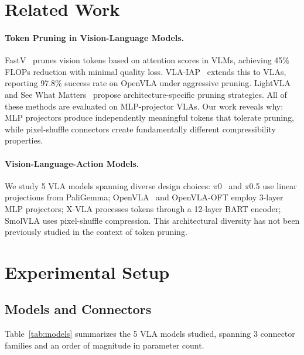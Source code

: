 \documentclass[10pt,twocolumn]{article}
\begin{document}
\section{Related Work}

\paragraph{Token Pruning in Vision-Language Models.}
FastV~\cite{chen2024fastv} prunes vision tokens based on attention scores in VLMs, achieving 45\% FLOPs reduction with minimal quality loss.
VLA-IAP~\cite{tang2024vlaiap} extends this to VLAs, reporting 97.8\% success rate on OpenVLA under aggressive pruning.
LightVLA~\cite{zhang2024lightvla} and See What Matters~\cite{seewhatmatters2026} propose architecture-specific pruning strategies.
All of these methods are evaluated on MLP-projector VLAs.
Our work reveals why: MLP projectors produce independently meaningful tokens that tolerate pruning, while pixel-shuffle connectors create fundamentally different compressibility properties.

\paragraph{Vision-Language-Action Models.}
We study 5 VLA models spanning diverse design choices: $\pi$0~\cite{black2024pi0} and $\pi$0.5 use linear projections from PaliGemma; OpenVLA~\cite{kim2024openvla} and OpenVLA-OFT employ 3-layer MLP projectors; X-VLA processes tokens through a 12-layer BART encoder; SmolVLA uses pixel-shuffle compression.
This architectural diversity has not been previously studied in the context of token pruning.

\section{Experimental Setup}

\subsection{Models and Connectors}

Table~\ref{tab:models} summarizes the 5 VLA models studied, spanning 3 connector families and an order of magnitude in parameter count.
\end{document}
